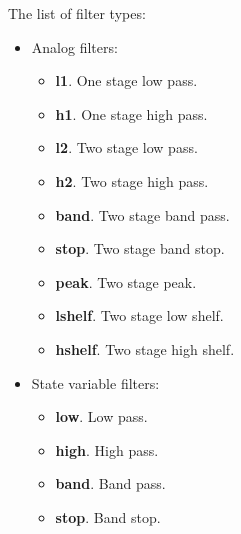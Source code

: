   The list of filter types:

   \begin{itemize}
      \item Analog filters:
      \begin{itemize}
          \item \textbf{l1}. One stage low pass.
          \item \textbf{h1}. One stage high pass.
          \item \textbf{l2}. Two stage low pass.
          \item \textbf{h2}. Two stage high pass.
          \item \textbf{band}. Two stage band pass.
          \item \textbf{stop}. Two stage band stop.
          \item \textbf{peak}. Two stage peak.
          \item \textbf{lshelf}. Two stage low shelf.
          \item \textbf{hshelf}. Two stage high shelf.
      \end{itemize}
      \item State variable filters:
      \begin{itemize}
         \item \textbf{low}. Low pass.
         \item \textbf{high}. High pass.
         \item \textbf{band}. Band pass.
         \item \textbf{stop}. Band stop.
      \end{itemize}
   \end{itemize}

